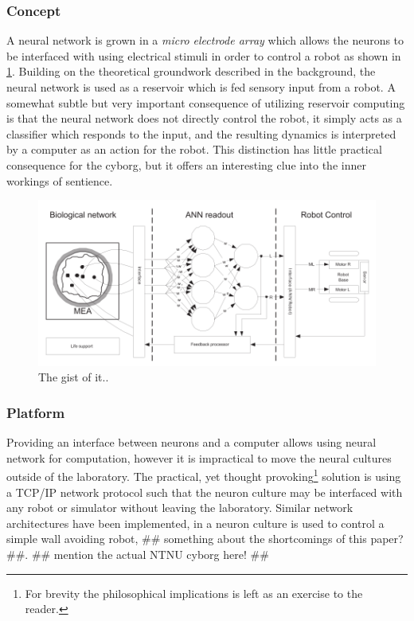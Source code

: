 \subsubsection{Concept}
A neural network is grown in a \textit{micro electrode array} which allows the
neurons to be interfaced with using electrical stimuli in order to control a
robot as shown in \ref{fig:cyborg_idea}.
Building on the theoretical groundwork described in the background, the neural
network is used as a reservoir which is fed sensory input from a robot.
A somewhat subtle but very important consequence of utilizing reservoir
computing is that the neural network does not directly control the robot, it
simply acts as a classifier which responds to the input, and the resulting
dynamics is interpreted by a computer as an action for the robot.
This distinction has little practical consequence for the cyborg, but it offers
an interesting clue into the inner workings of sentience.
\begin{figure}[h!]
    \includegraphics[width=\linewidth]{images/cyborg_overview.png}
    \caption{The gist of it..}
    \label{fig:cyborg_idea}
\end{figure}
\subsubsection{Platform}
Providing an interface between neurons and a computer allows using neural
network for computation, however it is impractical to move the neural cultures
outside of the laboratory.
The practical, yet thought provoking\footnote{For brevity the
  philosophical implications is left as an exercise to the reader.} solution is
using a TCP/IP network protocol such that the neuron culture may be interfaced with any
robot or simulator without leaving the laboratory.
Similar network architectures have been implemented, in
\cite{li_application_2015} a neuron culture is used to control a simple wall
avoiding robot, \#\# something about the shortcomings of this paper? \#\#.
\#\# mention the actual NTNU cyborg here! \#\#
